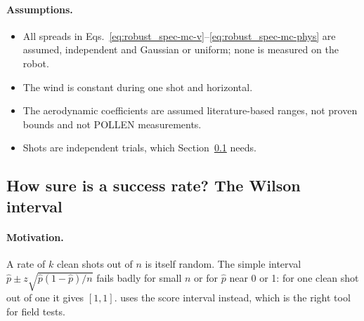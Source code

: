\paragraph{Assumptions.}
\begin{itemize}
  \item All spreads in Eqs.~\eqref{eq:robust_spec-mc-v}--\eqref{eq:robust_spec-mc-phys} are assumed, independent and
    Gaussian or uniform; none is measured on the robot.
  \item The wind is constant during one shot and horizontal.
  \item The aerodynamic coefficients are assumed literature-based ranges, not proven bounds and not
    POLLEN measurements.
  \item Shots are independent trials, which Section~\ref{sec:robust_spec-wilson} needs.
\end{itemize}

\subsection{How sure is a success rate? The Wilson interval}
\label{sec:robust_spec-wilson}

\paragraph{Motivation.}
A rate of $k$ clean shots out of $n$ is itself random.
The simple interval $\hat p\pm z\sqrt{\hat p(1-\hat p)/n}$ fails badly for small $n$ or for
$\hat p$ near 0 or 1: for one clean shot out of one it gives $[1,1]$.
 uses the score interval instead, which is the right tool for field tests.

